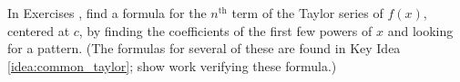 {\noindent In Exercises}
{, find a formula for the $n^\text{th}$ term of the Taylor series of $f(x)$, centered at $c$, by finding the coefficients of the first few powers of $x$ and looking for a pattern. (The formulas for several of these are found in Key Idea \ref{idea:common_taylor}; show work verifying these formula.)
}
